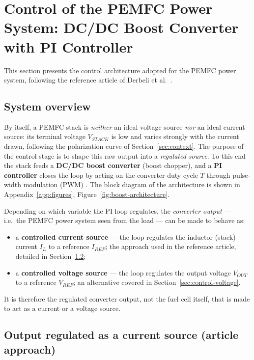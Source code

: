 \documentclass[11pt,a4paper]{article}
\begin{document}
\section{Control of the PEMFC Power System: DC/DC Boost Converter with PI Controller}
\label{sec:control}

This section presents the control architecture adopted for the PEMFC power
system, following the reference article of Derbeli et al.\ \cite{derbeli2017}.

\subsection{System overview}
\label{sec:control-overview}

By itself, a PEMFC stack is \emph{neither} an ideal voltage source \emph{nor} an
ideal current source: its terminal voltage $V_{STACK}$ is low and varies strongly
with the current drawn, following the polarization curve of
Section~\ref{sec:context}. The purpose of the control stage is to shape this raw
output into a \emph{regulated source}. To this end the stack feeds a
\textbf{DC/DC boost converter} (boost chopper), and a \textbf{PI controller}
closes the loop by acting on the converter duty cycle $T$ through pulse-width
modulation (PWM) \cite{derbeli2017}. The block diagram of the architecture is
shown in Appendix~\ref{app:figures}, Figure~\ref{fig:boost-architecture}.

Depending on which variable the PI loop regulates, the \emph{converter output}
--- i.e.\ the PEMFC power system seen from the load --- can be made to behave as:
\begin{itemize}[itemsep=1pt]
    \item a \textbf{controlled current source} --- the loop regulates the
          inductor (stack) current $I_L$ to a reference $I_{REF}$; the approach
          used in the reference article, detailed in
          Section~\ref{sec:control-current};
    \item a \textbf{controlled voltage source} --- the loop regulates the output
          voltage $V_{OUT}$ to a reference $V_{REF}$; an alternative covered in
          Section~\ref{sec:control-voltage}.
\end{itemize}
It is therefore the regulated converter output, not the fuel cell itself, that is
made to act as a current or a voltage source.

\subsection{Output regulated as a current source (article approach)}
\label{sec:control-current}
\end{document}
